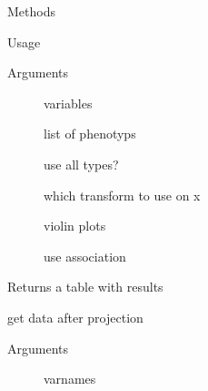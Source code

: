 \documentclass[letterpaper]{book}
\begin{document}
\begin{Section}{Methods}
\begin{SubSection}{}
\begin{SubSubSection}{Usage}
\end{SubSubSection}

%
\begin{SubSubSection}{Arguments}

\begin{description}

\item[] variables
\item[] list of phenotyps
\item[] use all types?
\item[] which transform to use on x
\item[] violin plots
\item[] use association

\end{description}



\end{SubSubSection}

%
\begin{SubSubSection}{Returns}
a table with results

\end{SubSubSection}

\end{SubSection}




\hypertarget{method-dataH-getProjectedData}{}
%
\begin{SubSection}{}
get data after projection
%

%
\begin{SubSubSection}{Arguments}

\begin{description}

\item[] varnames

\end{description}



\end{SubSubSection}


\end{SubSection}
\end{Section}
\end{document}
